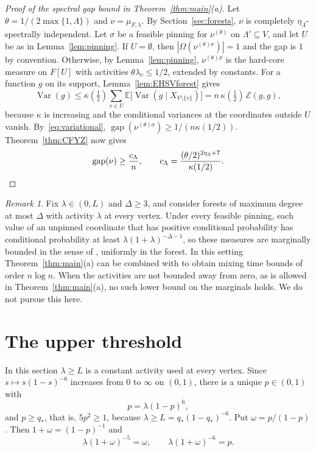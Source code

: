 \documentclass{amsart}
\numberwithin{equation}{section}
\numberwithin{table}{section}
\theoremstyle{definition}
\theoremstyle{remark}
\newtheorem{remark}[theorem]{Remark}
\newcommand{\E}{\mathbb{E}}
\newcommand{\Var}{\operatorname{Var}}
\newcommand{\gap}{\operatorname{gap}}
\newcommand{\qs}{q_{\ast}}
\begin{document}
\begin{proof}[Proof of the spectral gap bound in Theorem~\ref{thm:main}(a)]
Let $\theta=1/(2\max\{1,\Lambda\})$ and $\nu=\mu_{F,\lambda}$. By Section~\ref{sec:forests}, $\nu$ is completely $\eta_\Lambda$-spectrally independent. Let $\sigma$ be a feasible pinning for $\nu^{(\theta)}$ on $\Lambda'\subseteq V$, and let $U$ be as in Lemma~\ref{lem:pinning}. If $U=\emptyset$, then $|\Omega(\nu^{(\theta)\sigma})|=1$ and the gap is $1$ by convention. Otherwise, by Lemma~\ref{lem:pinning}, $\nu^{(\theta)\sigma}$ is the hard-core measure on $F[U]$ with activities $\theta\lambda_v\le1/2$, extended by constants. For a function $g$ on its support, Lemma~\ref{lem:EHSVforest} gives
\[
\Var(g)\le\kappa(\tfrac12)\sum_{v\in U}\E\bigl[\Var(g\mid X_{V\setminus\{v\}})\bigr]=n\,\kappa(\tfrac12)\,\mathcal E(g,g),
\]
because $\kappa$ is increasing and the conditional variances at the coordinates outside $U$ vanish. By~\eqref{eq:variational}, $\gap(\nu^{(\theta)\sigma})\ge1/(n\kappa(1/2))$. Theorem~\ref{thm:CFYZ} now gives
\[
\gap(\nu)\ge\frac{c_\Lambda}{n},\qquad c_\Lambda=\frac{(\theta/2)^{2\eta_\Lambda+7}}{\kappa(1/2)} .\qedhere
\]
\end{proof}

\begin{remark}
Fix $\lambda\in(0,L)$ and $\Delta\ge3$, and consider forests of maximum degree at most $\Delta$ with activity $\lambda$ at every vertex. Under every feasible pinning, each value of an unpinned coordinate that has positive conditional probability has conditional probability at least $\lambda(1+\lambda)^{-\Delta-1}$, so these measures are marginally bounded in the sense of \cite{CLV}, uniformly in the forest. In this setting Theorem~\ref{thm:main}(a) can be combined with \cite[Theorem~1.12]{CLV} to obtain mixing time bounds of order $n\log n$. When the activities are not bounded away from zero, as is allowed in Theorem~\ref{thm:main}(a), no such lower bound on the marginals holds. We do not pursue this here.
\end{remark}

\section{The upper threshold}\label{sec:upper}

In this section $\lambda\ge L$ is a constant activity used at every vertex. Since $s\mapsto s(1-s)^{-6}$ increases from $0$ to $\infty$ on $(0,1)$, there is a unique $p\in(0,1)$ with
\begin{equation}\label{eq:p}
p=\lambda(1-p)^6,
\end{equation}
and $p\ge\qs$, that is, $5p^2\ge1$, because $\lambda\ge L=\qs(1-\qs)^{-6}$. Put $\omega=p/(1-p)$. Then $1+\omega=(1-p)^{-1}$ and
\begin{equation}\label{eq:omega}
\lambda(1+\omega)^{-5}=\omega,\qquad \lambda(1+\omega)^{-6}=p .
\end{equation}
\end{document}
